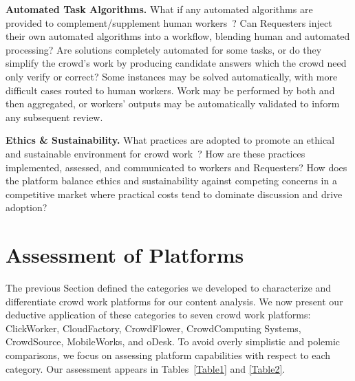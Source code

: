 \documentclass{sigchi}
\begin{document}
\begin{sidewaystable*}
\begin{tabular}[h]{| p{1.5cm}| p{2.7cm}| p{2.7cm}| p{2.7cm}| p{2.7cm}| p{2.7cm}| p{2.7cm}| p{2.7cm}|}
\hline
\end{tabular}
\label{Table2}
\end{sidewaystable*}



{\bf Automated Task Algorithms.} What if any automated algorithms are provided to complement/supplement human workers~\cite{hu2011monotrans2}? Can Requesters inject their own automated algorithms into a workflow, blending human and automated processing? Are solutions completely automated for some tasks, or do they simplify the crowd's work by producing candidate answers which the crowd need only verify or correct? Some instances may be solved automatically, with more difficult cases routed to human workers. Work may be performed by both and then aggregated, or workers' outputs may be automatically validated to inform any subsequent review.
 
{\bf Ethics \& Sustainability.} What practices are adopted to promote an ethical and sustainable environment for crowd 
work~\cite{fort2011amazon,Irani13}? 
How are these practices implemented, assessed, and communicated to workers and Requesters? How does the platform balance ethics and sustainability against competing concerns in a competitive market where practical costs tend to dominate discussion and drive adoption?


\section{Assessment of Platforms}

The previous Section defined the categories we developed to characterize and differentiate crowd work platforms for our content analysis. We now present our deductive application of these categories to seven crowd work platforms: ClickWorker, CloudFactory, CrowdFlower, CrowdComputing Systems, CrowdSource, MobileWorks, and oDesk. To avoid overly simplistic and polemic comparisons, we focus on assessing platform capabilities with respect to each category. Our assessment appears in Tables~\ref{Table1} and \ref{Table2}. 
\end{document}
